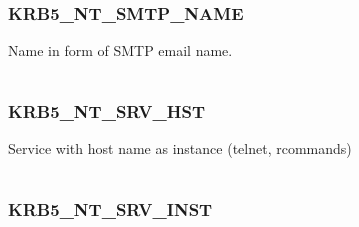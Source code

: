 \documentclass[letterpaper,10pt,english]{sphinxmanual}
\begin{document}
\subsubsection{KRB5\_NT\_SMTP\_NAME}
\label{appdev/refs/macros/KRB5_NT_SMTP_NAME:krb5-nt-smtp-name}\label{appdev/refs/macros/KRB5_NT_SMTP_NAME:krb5-nt-smtp-name-data}\label{appdev/refs/macros/KRB5_NT_SMTP_NAME::doc}

\begin{fulllineitems}
\label{appdev/refs/macros/KRB5_NT_SMTP_NAME:KRB5_NT_SMTP_NAME}
\end{fulllineitems}


Name in form of SMTP email name.

\begin{tabulary}{\linewidth}{|L|L|}
\hline

 & 
\\
\hline\end{tabulary}



\subsubsection{KRB5\_NT\_SRV\_HST}
\label{appdev/refs/macros/KRB5_NT_SRV_HST:krb5-nt-srv-hst-data}\label{appdev/refs/macros/KRB5_NT_SRV_HST::doc}\label{appdev/refs/macros/KRB5_NT_SRV_HST:krb5-nt-srv-hst}

\begin{fulllineitems}
\label{appdev/refs/macros/KRB5_NT_SRV_HST:KRB5_NT_SRV_HST}
\end{fulllineitems}


Service with host name as instance (telnet, rcommands)

\begin{tabulary}{\linewidth}{|L|L|}
\hline

 & 
\\
\hline\end{tabulary}



\subsubsection{KRB5\_NT\_SRV\_INST}
\label{appdev/refs/macros/KRB5_NT_SRV_INST:krb5-nt-srv-inst-data}\label{appdev/refs/macros/KRB5_NT_SRV_INST::doc}\label{appdev/refs/macros/KRB5_NT_SRV_INST:krb5-nt-srv-inst}
\end{document}
